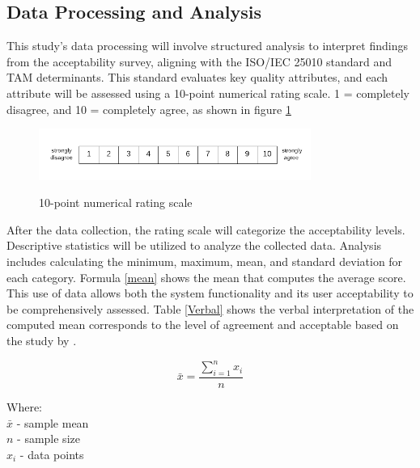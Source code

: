 \subsection{Data Processing and Analysis}
	This study's data processing will involve structured analysis to interpret findings from the acceptability survey, aligning with the ISO/IEC 25010 standard and TAM determinants. This standard evaluates key quality attributes, and each attribute will be assessed using a 10-point numerical rating scale. 1 = completely disagree, and 10 = completely agree, as shown in figure \ref{Nrs}
	
	\begin{figure}[h!]
		\caption{10-point numerical rating scale}
		\centering
		\includegraphics[width=3.5in]{Nrs-10}
		\label{Nrs}
	\end{figure}
	
	After the data collection, the rating scale will categorize the acceptability levels. Descriptive statistics will be utilized to analyze the collected data. Analysis includes calculating the minimum, maximum, mean, and standard deviation for each category. Formula \ref{mean} shows the mean that computes the average score. This use of data allows both the system functionality and its user acceptability to be comprehensively assessed. Table \ref{Verbal} shows the verbal interpretation of the computed mean corresponds to the level of agreement and acceptable based on the study by \textcite{Eladia2024}. 
	
	
	\begin{equation} 
		\label{mean}
		\bar{x} = \frac{\sum_{i=1}^{n} x_{i}}{n}
	\end{equation}
	
	Where:
	\\$\bar{x}$ - sample mean
	\\$n$ - sample size
	\\$x_{i}$ - data points
	
